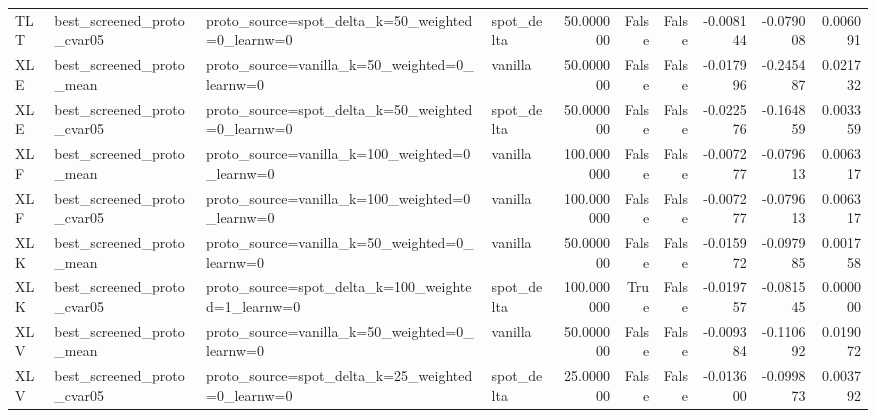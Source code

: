 \begin{tabular}{llllrrrrrr}
TLT & best\_screened\_proto\_cvar05 & proto\_source=spot\_delta\_k=50\_weighted=0\_learnw=0 & spot\_delta & 50.000000 & False & False & -0.008144 & -0.079008 & 0.006091 \\
XLE & best\_screened\_proto\_mean & proto\_source=vanilla\_k=50\_weighted=0\_learnw=0 & vanilla & 50.000000 & False & False & -0.017996 & -0.245487 & 0.021732 \\
XLE & best\_screened\_proto\_cvar05 & proto\_source=spot\_delta\_k=50\_weighted=0\_learnw=0 & spot\_delta & 50.000000 & False & False & -0.022576 & -0.164859 & 0.003359 \\
XLF & best\_screened\_proto\_mean & proto\_source=vanilla\_k=100\_weighted=0\_learnw=0 & vanilla & 100.000000 & False & False & -0.007277 & -0.079613 & 0.006317 \\
XLF & best\_screened\_proto\_cvar05 & proto\_source=vanilla\_k=100\_weighted=0\_learnw=0 & vanilla & 100.000000 & False & False & -0.007277 & -0.079613 & 0.006317 \\
XLK & best\_screened\_proto\_mean & proto\_source=vanilla\_k=50\_weighted=0\_learnw=0 & vanilla & 50.000000 & False & False & -0.015972 & -0.097985 & 0.001758 \\
XLK & best\_screened\_proto\_cvar05 & proto\_source=spot\_delta\_k=100\_weighted=1\_learnw=0 & spot\_delta & 100.000000 & True & False & -0.019757 & -0.081545 & 0.000000 \\
XLV & best\_screened\_proto\_mean & proto\_source=vanilla\_k=50\_weighted=0\_learnw=0 & vanilla & 50.000000 & False & False & -0.009384 & -0.110692 & 0.019072 \\
XLV & best\_screened\_proto\_cvar05 & proto\_source=spot\_delta\_k=25\_weighted=0\_learnw=0 & spot\_delta & 25.000000 & False & False & -0.013600 & -0.099873 & 0.003792 \\
\bottomrule
\end{tabular}
